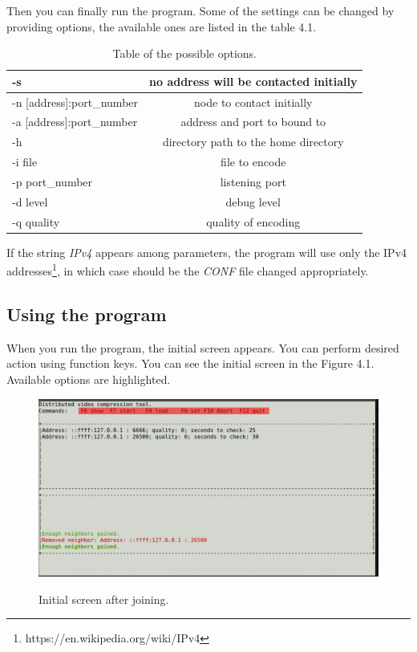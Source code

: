 Then you can finally run the program. Some of the settings can be changed by providing options, the available ones are listed in the table 4.1.

\begin{table}[h]
\begin{center}
 \begin{tabular}{ | l | c |}
   \hline
-s & no address will be contacted initially \\ \hline
-n [address]:port\_number & node to contact initially \\ \hline
-a [address]:port\_number & address and port to bound to \\ \hline
-h & directory path to the home directory \\ \hline
-i file & file to encode \\ \hline
-p port\_number & listening port \\ \hline
-d level & debug level \\ \hline
-q quality & quality of encoding \\ \hline
 \end{tabular}
 \caption{Table of the possible options.}
 \end{center}
\end{table}

If the string \textit{IPv4} appears among parameters, the program will use only the IPv4 addresses\footnote{https://en.wikipedia.org/wiki/IPv4},
in which case should be the \textit{CONF} file changed appropriately.

\subsection*{Using the program}
When you run the program, the initial screen appears. You can perform desired action using function keys. You can see the initial screen in the Figure 4.1. Available options are highlighted.
\begin{figure}[h]
\begin{center}
\includegraphics[scale=0.30]{./img/init-screen.pdf}
\label{initial-screen}
\caption[initial-screen]{Initial screen after joining.}
\end{center}
\end{figure}

